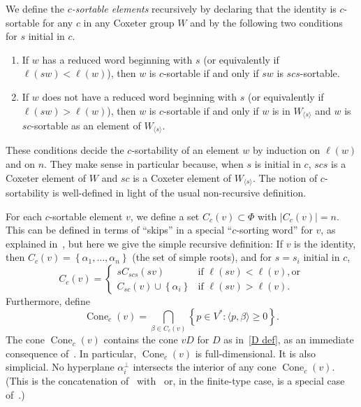\documentclass[ALCO,ThmDefs,Unicode,epreuves]{cedram}
\DeclareMathOperator{\Cone}{Cone}
\newcommand{\newword}[1]{\emph{#1}}
\newcommand{\set}[1]{{\left\lbrace #1 \right\rbrace}}
\newcommand{\br}[1]{{\langle #1 \rangle}}
\begin{document}
We define the \newword{$c$-sortable elements} recursively by declaring that the identity is $c$-sortable for any $c$ in any Coxeter group $W$ and by the following two conditions for $s$ initial in $c$.
\begin{enumerate}[label=(\roman*)] %
\item If $w$ has a reduced word beginning with $s$ (or equivalently if $\ell(sw)<\ell(w)$), then $w$ is $c$-sortable if and only if $sw$ is $scs$-sortable.
\item If $w$ does not have a reduced word beginning with $s$ (or equivalently if $\ell(sw)>\ell(w)$), then $w$ is $c$-sortable if and only if $w$ is in $W_\br{s}$ and $w$ is $sc$-sortable as an element of $W_\br{s}$.
\end{enumerate}
These conditions decide the $c$-sortability of an element $w$ by induction on $\ell(w)$ and on $n$.
They make sense in particular because, when $s$ is initial in $c$, $scs$ is a Coxeter element of $W$ and $sc$ is a Coxeter element of $W_\br{s}$.
The notion of $c$-sortability is well-defined in light of the usual non-recursive definition. 

For each $c$-sortable element $v$, we define a set $C_c(v)\subset\Phi$ with $|C_c(v)|=n$.
This can be defined in terms of ``skips'' in a special ``$c$-sorting word'' for $v$, as explained in~\cite[Section~5]{typefree}, but here we give the simple recursive definition:
If $v$ is the identity, then $C_c(v)=\set{\alpha_1,\ldots,\alpha_n}$ (the set of simple roots), and for $s=s_i$ initial in $c$, 
\begin{equation}\label{Cc def}
C_c(v)=\begin{cases}
sC_{scs}(sv)&\text{if }\ell(sv)<\ell(v),\text{or}\\
C_{sc}(v)\cup\set{\alpha_i}&\text{if }\ell(sv)>\ell(v).
\end{cases}
\end{equation}
Furthermore, define 
\begin{equation}
\Cone_c(v)=\bigcap_{\beta\in C_c(v)}\set{p\in V^*:\br{p,\beta}\ge0}.
\end{equation}
The cone $\Cone_c(v)$ contains the cone $vD$ for $D$ as in~\eqref{D def}, as an immediate consequence of~\cite[Theorem~6.3]{typefree}.
In particular, $\Cone_c(v)$ is full-dimensional.
It is also simplicial.
No hyperplane $\alpha_i^\perp$ intersects the interior of any cone $\Cone_c(v)$.
(This is the concatenation of~\cite[Proposition~4.26]{framework} with~\cite[Theorem~5.12]{framework} or, in the finite-type case, is a special case of~\cite[Proposition~9.5]{typefree}.)
\end{document}
